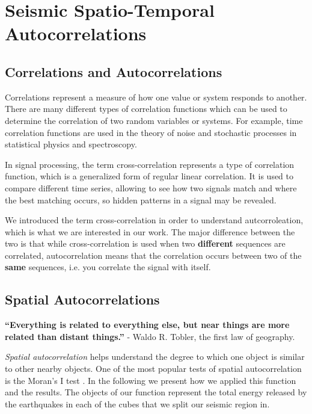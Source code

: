 \chapter{Seismic Spatio-Temporal Autocorrelations}
\label{chap:quakeCorrelations}

\section{Correlations and Autocorrelations}

Correlations represent a measure of how one value or system responds to another. There are many different types of correlation functions which can be used to determine the correlation of two random variables or systems. For example, time correlation functions are used in the theory of noise and stochastic processes in statistical physics and spectroscopy. \par 

In signal processing, the term cross-correlation represents a type of correlation function, which is a generalized form of regular linear correlation. It is used to compare different time series, allowing to see how two signals match and where the best matching occurs, so hidden patterns in a signal may be revealed.\par 

We introduced the term cross-correlation in order to understand autcorroleation, which is what we are interested in our work. The major difference between the two is that while cross-correlation is used when two {\bf different} sequences are correlated, autocorrelation means that the correlation occurs between two of the {\bf same} sequences, i.e. you correlate the signal with itself.


\section{Spatial Autocorrelations}
{\bf “Everything is related to everything else, but near things are more related than distant things.”} - Waldo R. Tobler, the first law of geography. \par \bigskip

{\it Spatial autocorrelation} helps understand the degree to which one object is similar to other nearby objects. One of the most popular tests of spatial autocorrelation is the Moran's I test \cite{moran}. In the following we present how we applied this function and the results. The objects of our function represent the total energy released by the earthquakes in each of the cubes that we split our seismic region in. \par


